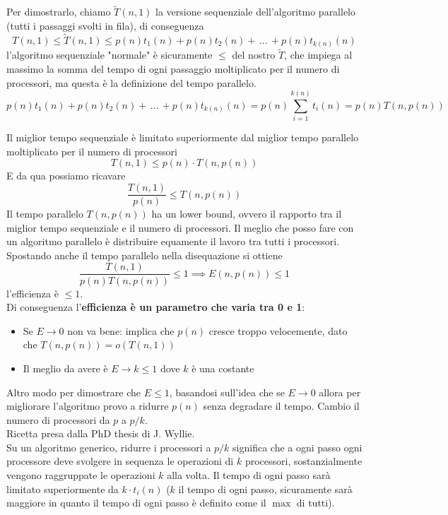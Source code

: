 \newpage

Per dimostrarlo, chiamo $\tilde{T} (n, 1)$ la versione sequenziale dell'algoritmo parallelo (tutti i passaggi svolti in fila), di conseguenza 
$$ T(n, 1) \leq \tilde{T} (n,1) \leq p(n) t_1 (n) + p(n) t_2 (n) + \, ... \, + p(n) t_{k(n)} (n) $$
l'algoritmo sequenziale "normale" è sicuramente $\leq$ del nostro $\tilde{T}$, che impiega al massimo la somma del tempo di ogni passaggio moltiplicato per il numero di processori, ma questa è la definizione del tempo parallelo.\\
$$ p(n) t_1 (n) + p(n) t_2 (n) + \, ... \, + p(n) t_{k(n)} (n) = p(n) \sum_{i = 1}^{k(n)} t_i (n) = p(n) T(n, p(n)) $$

Il miglior tempo sequenziale è limitato superiormente dal miglior tempo parallelo moltiplicato per il numero di processori
$$ T(n,1) \leq p(n) \cdot T(n, p(n)) $$
E da qua possiamo ricavare
$$ \frac{T(n,1)}{p(n)} \leq T(n, p(n))$$
Il tempo parallelo $T(n, p(n))$ ha un lower bound, ovvero il rapporto tra il miglior tempo sequenziale e il numero di processori. Il meglio che posso fare con un algoritmo parallelo è distribuire equamente il lavoro tra tutti i processori.\\

Spostando anche il tempo parallelo nella disequazione si ottiene 
$$ \frac{T(n,1)}{p(n) T(n, p(n))} \leq 1 \implies E(n, p(n)) \leq 1$$
l'efficienza è $\leq 1$.\\

Di conseguenza l'\textbf{efficienza è un parametro che varia tra 0 e 1}: 
\begin{itemize}
	\item Se $E \rightarrow 0$ non va bene: implica che $p(n)$ cresce troppo velocemente, dato che $T(n, p(n)) = o(T(n,1))$
	\item Il meglio da avere è $E \rightarrow k \leq 1$ dove $k$ è una costante
\end{itemize}

\newpage

Altro modo per dimostrare che $E \leq 1$, basandosi sull'idea che se $E \rightarrow 0$ allora per migliorare l'algoritmo provo a ridurre $p(n)$ senza degradare il tempo. Cambio il numero di processori da $p$ a $p/k$.\\

Ricetta presa dalla PhD thesis di J. Wyllie.\\

Su un algoritmo generico, ridurre i processori a $p/k$ significa che a ogni passo ogni processore deve svolgere in sequenza le operazioni di $k$ processori, sostanzialmente vengono raggruppate le operazioni $k$ alla volta. Il tempo di ogni passo sarà limitato superiormente da $k \cdot t_i(n)$ ($k$ il tempo di ogni passo, sicuramente sarà maggiore in quanto il tempo di ogni passo è definito come il $\max$ di tutti).\\

